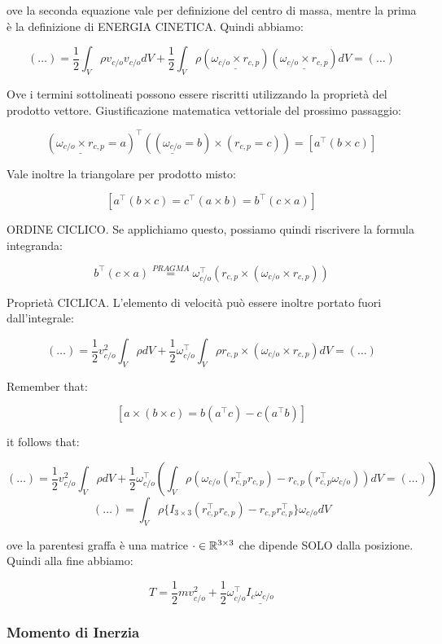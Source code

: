ove la seconda equazione vale per definizione del centro di massa, mentre la prima è la definizione di ENERGIA CINETICA. Quindi abbiamo:

\[
	(\dots) = \frac{1}{2}\int_V{\rho v_{c/o}v_{c/o}dV} + \frac{1}{2}\int_V{\rho (\underline{\omega_{c/o}\times r_{c,p}})(\underline{\omega_{c/o}\times r_{c,p}})dV} = (\dots)
\]

Ove i termini sottolineati possono essere riscritti utilizzando la proprietà del prodotto vettore. Giustificazione matematica vettoriale del prossimo passaggio:

\[
	(\underline{\omega_{c/o}\times r_{c,p}}=a)^\top ((\underline{\omega_{c/o}}=b)\times (r_{c,p}=c)) = [a^\top(b\times c)]
\]

Vale inoltre la triangolare per prodotto misto:

\[
	[a^\top(b\times c) = c^\top(a\times b) = b^\top(c\times a)]
\]

ORDINE CICLICO. Se applichiamo questo, possiamo quindi riscrivere la formula integranda: 

\[
	b^\top(c\times a) \stackrel{PRAGMA}{=} \omega_{c/o}^\top (r_{c,p}\times (\omega_{c/o}\times r_{c,p}))
\]

Proprietà CICLICA. L'elemento di velocità può essere inoltre portato fuori dall'integrale:

\[
	(\dots) = \frac{1}{2}v_{c/o}^2\int_V{\rho dV} + \frac{1}{2}\omega_{c/o}^\top\int_V{\rho r_{c,p}\times (\omega_{c/o}\times r_{c,p})dV} = (\dots)
\]

Remember that:

\[
	[a\times(b\times c) = b(a^\top c) - c(a^\top b)]
\]

it follows that:

\[
	(\dots) = \frac{1}{2}v_{c/o}^2\int_V{\rho dV} + \frac{1}{2}\omega_{c/o}^\top(\int_V{\rho(\omega_{c/o}(r_{c,p}^\top r_{c,p}) - r_{c,p}(r_{c,p}^\top \omega_{c/o}))dV} = (\dots))
\]
\[
	(\dots) = \int_V{\rho \{I_{3\times 3}(r_{c,p}^\top r_{c,p}) - r_{c,p}r_{c,p}^\top\}\omega_{c/o}dV}
\]

ove la parentesi graffa è una matrice $\mathord{\cdot}\in\mathbb{R}^{3\times 3}$ che dipende SOLO dalla posizione. Quindi alla fine abbiamo:

\[
	T = \frac{1}{2}mv_{c/o}^2 + \frac{1}{2}\omega_{c/o}^\top\underline{I_c\omega_{c/o}}
\]

\subsubsection{Momento di Inerzia}

